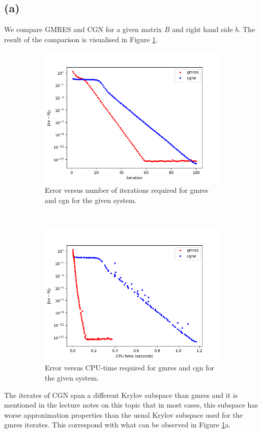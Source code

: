 \subsection{(a)}
We compare GMRES and CGN for a given matrix $B$ and right hand side $b$. The result of the comparison is visualised in Figure \ref{task6}.
\begin{figure}[h!]
	\centering
	\begin{subfigure}[t]{0.49\textwidth}
		\includegraphics[width=\textwidth]{error_itr.png}
		\caption{Error versus number of iterations required for gmres and cgn for the given system.}
	\end{subfigure}~
	\begin{subfigure}[t]{0.49\textwidth}
		\includegraphics[width=\textwidth]{error_time.png}	
		\caption{Error versus CPU-time required for gmres and cgn for the given system.}
	\end{subfigure}
	\caption{}
	\label{task6}
\end{figure}
The iterates of CGN span a different Krylov subspace than gmres and it is mentioned in the lecture notes on this topic that in most cases, this subspace has worse approximation properties than the usual Krylov subspace used for the gmres iterates. This correspond with what can be observed in Figure \ref{task6}a. 
